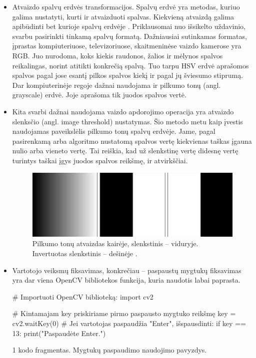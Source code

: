 \documentclass[a4paper,12pt]{article}
\begin{document}
\begin{itemize}
	\item Atvaizdo spalvų erdvės transformacijos. Spalvų erdvė yra metodas, kuriuo galima nustatyti, kurti ir atvaizduoti spalvas. Kiekvieną atvaizdą galima apibūdinti bet kurioje spalvų erdvėje \cite{COLORSPACE}. Priklausomai nuo išsikelto uždavinio, svarbu pasirinkti tinkamą spalvų formatą. Dažniausiai sutinkamas formatas, įprastas kompiuteriuose, televizoriuose, skaitmeninėse vaizdo kamerose yra RGB. Juo nurodoma, koks kiekis raudonos, žalios ir mėlynos spalvos reikalingas, norint atitikti konkrečią spalvą. Tuo tarpu HSV erdvė aprašomos spalvos pagal jose esantį pilkos spalvos kiekį ir pagal jų šviesumo stiprumą. Dar kompiuterinėje regoje dažnai naudojama ir pilkumo tonų (angl. grayscale) erdvė. Joje aprašoma tik juodos spalvos vertė. 
	\item  Kita svarbi dažnai naudojama vaizdo apdorojimo operacija yra atvaizdo slenksčio (angl. image threshold) nustatymas. Šio metodo metu kaip įvestis naudojamas paveikslėlis pilkumo tonų spalvų erdvėje. Jame, pagal pasirenkamą arba algoritmo nustatomą spalvos vertę kiekvienas taškas įgauna nulio arba vieneto vertę. Tai reiškia, kad už slenkstinę vertę didesnę vertę turintys taškai įgys juodos spalvos reikšmę, ir atvirkščiai.
	\begin{figure}[H]
			\centering
			\includegraphics[scale=0.4]{images/threshold}
			\caption{Pilkumo tonų atvaizdas kairėje, slenkstinis – viduryje. Invertuotas slenkstinis – dešinėje \cite{THRESHOLD}.}   %
			\label{img:threshold}
	\end{figure}
	
	\item Vartotojo veiksmų fiksavimas, konkrečiau – paspaustų mygtukų fiksavimas yra dar viena OpenCV bibliotekos funkcija, kuria naudotis labai paprasta.
	\begin{listing}[H]
		\begin{pythoncode}
			# Importuoti OpenCV biblioteką:
			import cv2

			# Kintamajam key priskiriame pirmo paspausto mygtuko reikšmę
			key = cv2.waitKey(0)
			# Jei vartotojas paspaudžia "Enter", išspausdinti:
			if key == 13:
				print("Paspaudėte Enter.")
		\end{pythoncode}
	\begin{center}
		1 kodo fragmentas. Mygtukų paspaudimo naudojimo pavyzdys.
	\end{center}		
	\end{listing}
	

\end{itemize}
\end{document}
